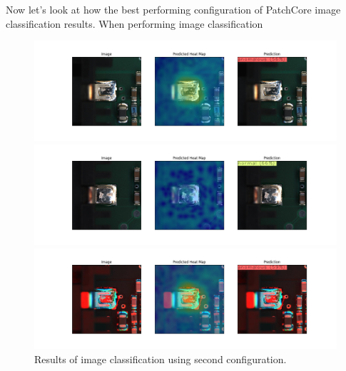 Now let's look at how the best performing configuration of PatchCore image classification results. When performing image classification

\begin{figure}[ht!]
    \centering  
    \begin{minipage}{1\textwidth}
        \centering
        \includegraphics[width=1\textwidth]{Rohit_Master_Thesis//Images/IC_NG.png} %
    \end{minipage}
    

    \begin{minipage}{1\textwidth}
        \centering
        \includegraphics[width=1\textwidth]{Rohit_Master_Thesis//Images/IC_FC.png} %
    \end{minipage}
    

    \begin{minipage}{1\textwidth}
        \centering
        \includegraphics[width=1\textwidth]{Rohit_Master_Thesis//Images/IC_NG2.png} %
    \end{minipage}
    
    \caption{Results of image classification using second configuration.}
    \label{fig:dataset-NG-vertical}
\end{figure}


